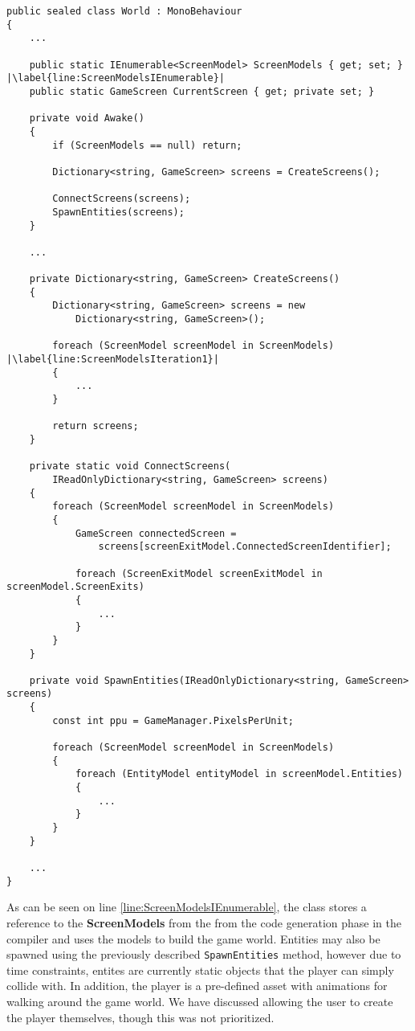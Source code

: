 \begin{lstlisting}[language=CSharp, caption={The \textbf{World} class responsible for generating and connectind screens.}, label={lst:WorldClassUnity},escapechar=|]
public sealed class World : MonoBehaviour
{
	...
    
    public static IEnumerable<ScreenModel> ScreenModels { get; set; } |\label{line:ScreenModelsIEnumerable}|
    public static GameScreen CurrentScreen { get; private set; }
    
    private void Awake()
    {
        if (ScreenModels == null) return;
        
        Dictionary<string, GameScreen> screens = CreateScreens();

        ConnectScreens(screens);
        SpawnEntities(screens);
    }

	...

    private Dictionary<string, GameScreen> CreateScreens()
    {
        Dictionary<string, GameScreen> screens = new 
            Dictionary<string, GameScreen>();

        foreach (ScreenModel screenModel in ScreenModels) |\label{line:ScreenModelsIteration1}|
        {
			...
        }

        return screens;
    }

    private static void ConnectScreens(
        IReadOnlyDictionary<string, GameScreen> screens)
    {
        foreach (ScreenModel screenModel in ScreenModels) 
        {
            GameScreen connectedScreen = 
                screens[screenExitModel.ConnectedScreenIdentifier];

            foreach (ScreenExitModel screenExitModel in screenModel.ScreenExits)
            {
				...
            }
        }
    }

    private void SpawnEntities(IReadOnlyDictionary<string, GameScreen> screens)
    {
        const int ppu = GameManager.PixelsPerUnit;
        
        foreach (ScreenModel screenModel in ScreenModels)
        {
            foreach (EntityModel entityModel in screenModel.Entities)
            {
				...
            }
        }
    }
	
	...
}
\end{lstlisting}

As can be seen on line \ref{line:ScreenModelsIEnumerable}, the class stores a reference to the \textbf{ScreenModels} from the from the code generation phase in the compiler and uses the models to build the game world. 
Entities may also be spawned using the previously described \texttt{SpawnEntities} method, however due to time constraints, entites are currently static objects that the player can simply collide with. 
In addition, the player is a pre-defined asset with animations for walking around the game world. We have discussed allowing the user to create the player themselves, though this was not prioritized.


